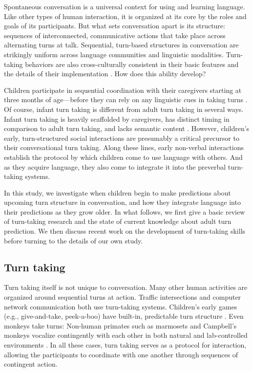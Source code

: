 \documentclass[authoryear, 12pt]{elsarticle}
\begin{document}
Spontaneous conversation is a universal context for using and learning language. Like other types of human interaction, it is organized at its core by the roles and goals of its participants. But what sets conversation apart is its structure: sequences of interconnected, communicative actions that take place across alternating turns at talk. Sequential, turn-based structures in conversation are strikingly uniform across language communities and linguistic modalities. Turn-taking behaviors are also cross-culturally consistent in their basic features and the details of their implementation \citep{stivers2009, dingemanse2013, de-vosInPrep}. How does this ability develop? 

Children participate in sequential coordination with their caregivers starting at three months of age---before they can rely on any linguistic cues in taking turns \citep[see, among others, ][]{bateson1975, snow1977, jaffe2001, hilbrinkInPrep}. Of course, infant turn taking is different from adult turn taking in several ways. Infant turn taking is heavily scaffolded by caregivers, has distinct timing in comparison to adult turn taking, and lacks semantic content \citep{hilbrinkInPrep, jaffe2001}. However, children's early, turn-structured social interactions are presumably a critical precursor to their conversational turn taking. Along these lines, early non-verbal interactions establish the protocol by which children come to use language with others. And as they acquire language, they also come to integrate it into the preverbal turn-taking systems.

In this study, we investigate when children begin to make predictions about upcoming turn structure in conversation, and how they integrate language into their predictions as they grow older. In what follows, we first give a basic review of turn-taking research and the state of current knowledge about adult turn prediction. We then discuss recent work on the development of turn-taking skills before turning to the details of our own study.

\subsection{Turn taking}

Turn taking itself is not unique to conversation. Many other human activities are organized around sequential turns at action. Traffic intersections and computer network communication both use turn-taking systems. Children's early games (e.g., give-and-take, peek-a-boo) have built-in, predictable turn structure \citep{ratner1978, ross1987}. Even monkeys take turns: Non-human primates such as marmosets and Campbell's monkeys vocalize contingently with each other in both natural and lab-controlled environments \citep{lemasson2011, takahashi2013}. In all these cases, turn taking serves as a protocol for interaction, allowing the participants to coordinate with one another through sequences of contingent action. 
\end{document}
